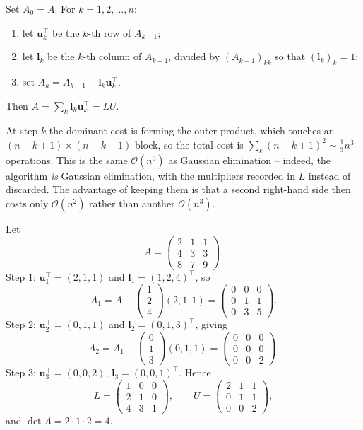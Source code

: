 \begin{method}
  Set $A_0 = A$. For $k = 1, 2, \dots, n$:
  \begin{enumerate}[label=(\roman*)]
    \item let $\mathbf{u}_k^\top$ be the $k$-th row of $A_{k-1}$;
    \item let $\mathbf{l}_k$ be the $k$-th column of $A_{k-1}$, divided by $(A_{k-1})_{kk}$ so that $(\mathbf{l}_k)_k = 1$;
    \item set $A_k = A_{k-1} - \mathbf{l}_k\mathbf{u}_k^\top$.
  \end{enumerate}
  Then $A = \sum_k \mathbf{l}_k\mathbf{u}_k^\top = LU$.
\end{method}

At step $k$ the dominant cost is forming the outer product, which touches an $(n-k+1)\times(n-k+1)$ block, so the total cost is $\sum_k (n-k+1)^2 \sim \tfrac13 n^3$ operations. This is the same $\mathcal{O}(n^3)$ as Gaussian elimination -- indeed, the algorithm \emph{is} Gaussian elimination, with the multipliers recorded in $L$ instead of discarded. The advantage of keeping them is that a second right-hand side then costs only $\mathcal{O}(n^2)$ rather than another $\mathcal{O}(n^3)$.

\begin{example}
  Let
  $$
  A = \begin{pmatrix} 2 & 1 & 1\\ 4 & 3 & 3\\ 8 & 7 & 9\end{pmatrix}.
  $$
  Step $1$: $\mathbf{u}_1^\top = (2,1,1)$ and $\mathbf{l}_1 = (1,2,4)^\top$, so
  $$
  A_1 = A - \begin{pmatrix}1\\2\\4\end{pmatrix}(2,1,1) = \begin{pmatrix}0&0&0\\0&1&1\\0&3&5\end{pmatrix}.
  $$
  Step $2$: $\mathbf{u}_2^\top = (0,1,1)$ and $\mathbf{l}_2 = (0,1,3)^\top$, giving
  $$
  A_2 = A_1 - \begin{pmatrix}0\\1\\3\end{pmatrix}(0,1,1) = \begin{pmatrix}0&0&0\\0&0&0\\0&0&2\end{pmatrix}.
  $$
  Step $3$: $\mathbf{u}_3^\top = (0,0,2)$, $\mathbf{l}_3 = (0,0,1)^\top$. Hence
  $$
  L = \begin{pmatrix}1&0&0\\2&1&0\\4&3&1\end{pmatrix}, \qquad U = \begin{pmatrix}2&1&1\\0&1&1\\0&0&2\end{pmatrix},
  $$
  and $\det A = 2 \cdot 1\cdot 2 = 4$.
\end{example}

